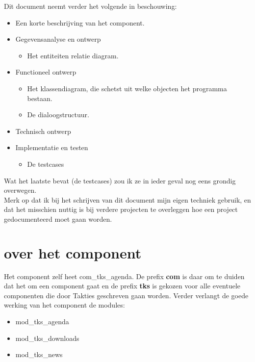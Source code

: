 \documentclass{article}
\begin{document}
\newpage
Dit document neemt verder het volgende in beschouwing:\\
\begin{itemize}
\item Een korte beschrijving van het component. \\
\item Gegevensanalyse en ontwerp
\begin{itemize}
\item Het entiteiten relatie diagram. \\
\end{itemize}
\item Functioneel ontwerp
\begin{itemize}
\item Het klassendiagram, die schetst uit welke objecten het programma bestaan. \\
\item De dialoogstructuur. \\
\end{itemize}
\item Technisch ontwerp
\item Implementatie en testen
\begin{itemize}
\item De testcases
\end{itemize}
\end{itemize}
Wat het laatste bevat (de testcases) zou ik ze in ieder geval nog eens grondig overwegen. \\
Merk op dat ik bij het schrijven van dit document mijn eigen techniek gebruik, en dat het misschien nuttig is bij verdere projecten te overleggen hoe een project gedocumenteerd moet gaan worden.

\newpage
\section{over het component}

Het component zelf heet com\_tks\_agenda. De prefix \textbf{com\textunderscore} is daar om te duiden dat het om een component gaat en de prefix \textbf{tks\textunderscore} is gekozen voor alle eventuele componenten die door Takties geschreven gaan worden. Verder verlangt de goede werking van het component de modules: \\

\begin{itemize}
\item mod\_tks\_agenda
\item mod\_tks\_downloads
\item mod\_tks\_news
\end{itemize}
\end{document}
